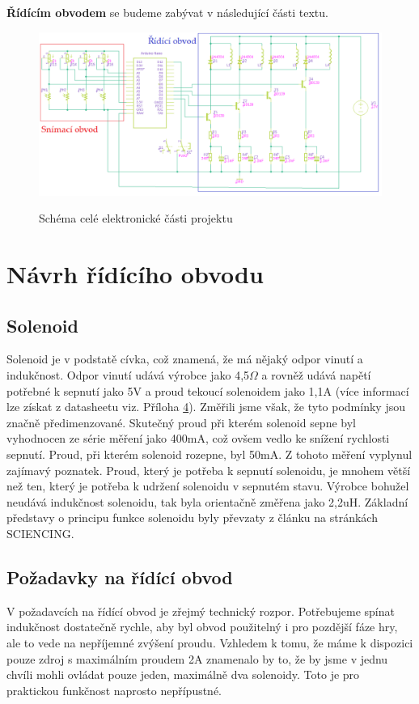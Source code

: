 \documentclass[12pt,oneside]{book} %
\begin{document}
\qquad\textbf{Řídícím obvodem} se budeme zabývat v následující části textu.

\begin{figure}[ht] \large\centering
\includegraphics[width=1.00\textwidth]{./img/schematic.png}\\[1cm] 
\caption{Schéma celé elektronické části projektu}
\label{schematic}
\end{figure} 

\chapter{Návrh řídícího obvodu}\label{ridiciobvod}
\section{Solenoid}\label{solenoid_elektro}
\qquad Solenoid je v podstatě cívka, což znamená, že má nějaký odpor vinutí a indukčnost. Odpor vinutí udává výrobce jako 4,5$\Omega$ a rovněž udává napětí potřebné k sepnutí jako 5V a proud tekoucí solenoidem jako 1,1A (více informací lze získat z datasheetu viz. Příloha \hyperref[Prilohy]{4}). Změřili jsme však, že tyto podmínky jsou značně předimenzované. Skutečný proud při kterém solenoid sepne byl vyhodnocen ze série měření jako 400mA, což ovšem vedlo ke snížení rychlosti sepnutí. Proud, při kterém solenoid rozepne, byl 50mA. Z tohoto měření vyplynul zajímavý poznatek. Proud, který je potřeba k sepnutí solenoidu, je mnohem větší než ten, který je potřeba k udržení solenoidu v sepnutém stavu. Výrobce bohužel neudává indukčnost solenoidu, tak byla orientačně změřena jako 2,2uH. Základní představy o principu funkce solenoidu byly převzaty z článku na stránkách SCIENCING. \cite{solenoid_bib}

\section{Požadavky na řídící obvod}\label{pozadavky}
\qquad V požadavcích na řídící obvod je zřejmý technický rozpor. Potřebujeme spínat indukčnost dostatečně rychle, aby byl obvod použitelný i pro pozdější fáze hry, ale to vede na nepříjemné zvýšení proudu. Vzhledem k tomu, že máme k dispozici pouze zdroj s maximálním proudem 2A znamenalo by to, že by jsme v jednu chvíli mohli ovládat pouze jeden, maximálně dva solenoidy. Toto je pro praktickou funkčnost naprosto nepřípustné.
\end{document}
